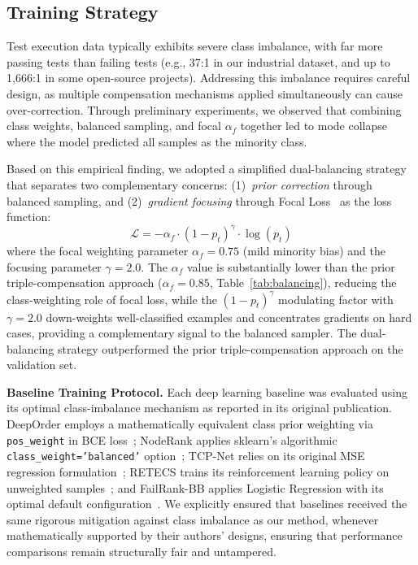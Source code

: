 \documentclass[10pt,journal,compsoc]{IEEEtran}
\begin{document}
\subsection{Training Strategy}
\label{sec:training}

Test execution data typically exhibits severe class imbalance, with far more
passing tests than failing tests (e.g., 37:1 in our industrial dataset, and
up to 1,666:1 in some open-source projects). Addressing this imbalance
requires careful design, as multiple compensation mechanisms applied
simultaneously can cause over-correction. Through preliminary experiments,
we observed that combining class weights, balanced sampling, and focal $\alpha_f$
together led to mode collapse where the model predicted all samples as the
minority class.

Based on this empirical finding, we adopted a simplified dual-balancing
strategy that separates two complementary concerns: (1)~\emph{prior
correction} through balanced sampling, and (2)~\emph{gradient focusing}
through Focal Loss~\cite{lin2017focal} as the loss function:
\begin{equation}
    \mathcal{L} = -\alpha_f \cdot (1 - p_t)^\gamma \cdot \log(p_t)
\end{equation}
where the focal weighting parameter $\alpha_f = 0.75$ (mild minority bias)
and the focusing parameter $\gamma = 2.0$.
The $\alpha_f$ value is substantially lower than the prior triple-compensation
approach ($\alpha_f = 0.85$, Table~\ref{tab:balancing}), reducing the
class-weighting role of focal loss, while the $(1 - p_t)^\gamma$ modulating
factor with $\gamma = 2.0$ down-weights well-classified examples and
concentrates gradients on hard cases, providing a complementary signal to the
balanced sampler. The dual-balancing strategy outperformed the prior
triple-compensation approach on the validation set.

\textbf{Baseline Training Protocol.} Each deep learning baseline was evaluated
using its optimal class-imbalance mechanism as reported in its original
publication. DeepOrder employs a mathematically equivalent class prior weighting via \texttt{pos\_weight} in BCE
loss~\cite{chen2023deeporder}; NodeRank applies sklearn's algorithmic \texttt{class\_weight='balanced'}
option~\cite{li2024noderank}; TCP-Net relies on its original MSE regression formulation~\cite{abdelkarim2022tcp};
RETECS trains its reinforcement learning policy on unweighted samples~\cite{spieker2017reinforcement};
and FailRank-BB applies Logistic Regression with its optimal default configuration~\cite{hernandes2025method}.
We explicitly ensured that baselines received the same rigorous mitigation against class imbalance as
our method, whenever mathematically supported by their authors' designs, ensuring that performance
comparisons remain structurally fair and untampered.
\end{document}
